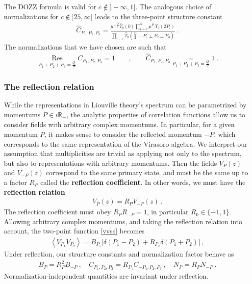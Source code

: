 \documentclass[12pt, a4paper, notitlepage, twoside]{report}
\numberwithin{equation}{section}
\theoremstyle{break}
\begin{document}
The DOZZ formula is valid for $c\notin ]-\infty, 1]$. The analogous choice of normalizations for $c\notin [25,\infty[$ leads to the three-point structure constant 
\begin{align}
 \hat C_{P_1,P_2,P_3} =  \frac{\mu^{-\frac{Q}{2}}\hat\Upsilon_b(0)\prod_{i=1}^3 \mu^{P_i}\hat\Upsilon_b(2P_i) }{\prod_{\pm,\pm} \hat\Upsilon_b\left(\tfrac{Q}{2}+P_1\pm P_2 \pm P_3\right)} \ .
\label{hc}
\end{align}
The normalizations that we have chosen are such that
\begin{align}
 \underset{P_1+P_2+P_3=\frac{Q}{2}}{\operatorname{Res}} C_{P_1,P_2,P_3} = 1 \qquad , \qquad \hat C_{P_1,P_2,P_3}\underset{P_1+P_2+P_3=\frac{Q}{2}}{=} 1\ .
\label{chco}
 \end{align}

\subsubsection{The reflection relation}

While the representations in Liouville theory's spectrum can be parametrized by momentums $P\in i\mathbb{R}_+$, the analytic properties of correlation functions allow us to consider fields with arbitrary complex momentums. 
In particular, for a given momentum $P$, it makes sense to consider the reflected momentum $-P$, which corresponds to the same representation of the Virasoro algebra. 
We interpret our assumption that multiplicities are trivial as applying not only to the spectrum, but also to representations with arbitrary momentums. Then the fields $V_P(z)$ and $V_{-P}(z)$ correspond to the same primary state, and must be the same up to a factor $R_P$ called the \textbf{\boldmath reflection coefficient}. In other words, we must have the \textbf{\boldmath reflection relation}
\begin{align}
V_P(z)= R_P V_{-P}(z)\ .
\label{vrv}
\end{align}
The reflection coefficient must obey $R_PR_{-P}=1$, in particular $R_0\in \{-1,1\}$. Allowing arbitrary complex momentums, and taking the reflection relation into account, the two-point function \eqref{vvss} becomes 
\begin{align}
 \left<V_{P_1}V_{P_2}\right> = B_{P_1}\Big[ \delta(P_1-P_2) + R_{P_2}\delta(P_1+P_2) \Big]\ ,
\end{align}
Under reflection, our structure constants and normalization factor behave as 
\begin{align}
 B_P=R_P^2B_{-P} \ , \quad C_{P_1,P_2,P_3} = R_{P_1} C_{-P_1,P_2,P_3} \ , \quad N_P=R_PN_{-P}\ .
\end{align}
Normalization-independent quantities are invariant under reflection.
\end{document}
